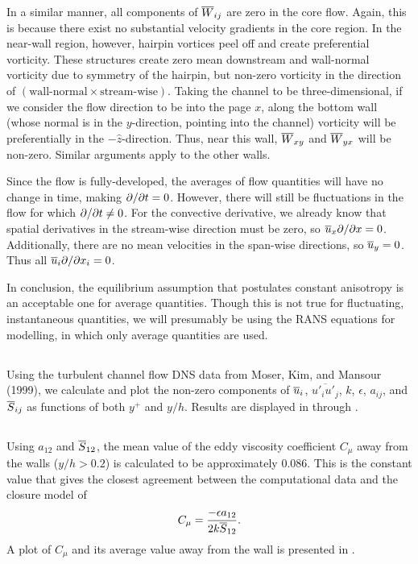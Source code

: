 \documentclass[11pt]{article}
\begin{document}
In a similar manner, all components of $\overline{W}_{ij}$ are zero in the core flow. Again, this is because there exist no substantial velocity gradients in the core region. In the near-wall region, however, hairpin vortices peel off and create preferential vorticity. These structures create zero mean downstream and wall-normal vorticity due to symmetry of the hairpin, but non-zero vorticity in the direction of $(\text{wall-normal} \times \text{stream-wise})$. Taking the channel to be three-dimensional, if we consider the flow direction to be into the page $x$, along the bottom wall (whose normal is in the $y$-direction, pointing into the channel) vorticity will be preferentially in the $-\hat{z}$-direction. Thus, near this wall, $\overline{W}_{xy}$ and $\overline{W}_{yx}$ will be non-zero. Similar arguments apply to the other walls.

Since the flow is fully-developed, the averages of flow quantities will have no change in time, making $\partial  / \partial t=0$. However, there will still be fluctuations in the flow for which $\partial  / \partial t \neq 0$. For the convective derivative, we already know that spatial derivatives in the stream-wise direction must be zero, so $\overline{u}_x \partial  / \partial x=0$. Additionally, there are no mean velocities in the span-wise directions, so $\overline{u}_y=0$. Thus all $\overline{u}_i \partial  / \partial x_i=0$.

In conclusion, the equilibrium assumption that postulates constant anisotropy is an acceptable one for average quantities. Though this is not true for fluctuating, instantaneous quantities, we will presumably be using the RANS equations for modelling, in which only average quantities are used.

\subsection{}

Using the turbulent channel flow DNS data from Moser, Kim, and Mansour (1999), we calculate and plot the non-zero components of $\overline{u}_i$, $\overline{u'_i u'_j}$, $k$, $\epsilon$, $a_{ij}$, and $\overline{S}_{ij}$ as functions of both $y^+$ and $y/h$. Results are displayed in  through .

\subsection{}

Using $a_{12}$ and $\overline{S}_{12}$, the mean value of the eddy viscosity coefficient $C_\mu$ away from the walls ($y/h > 0.2$) is calculated to be approximately 0.086. This is the constant value that gives the closest agreement between the computational data and the closure model of
\begin{equation}
C_\mu =
\frac{-\epsilon a_{12}}{2k \overline{S}_{12}}
.
\end{equation}
A plot of $C_\mu$ and its average value away from the wall is presented in .
\end{document}
